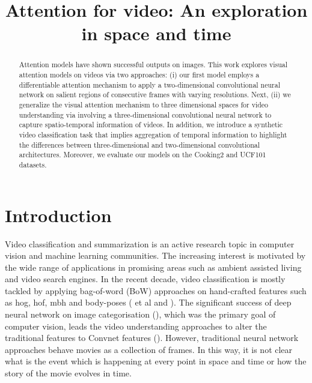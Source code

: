 \documentclass{article} %
\title{Attention for video: An exploration in space and time}
\begin{document}
\maketitle

\begin{abstract}
Attention models have shown successful outputs on images. This work explores visual attention models on videos via two approaches: (i) our first model employs a differentiable attention mechanism to apply a two-dimensional convolutional neural network on salient regions of consecutive frames with varying resolutions.
Next, (ii) we generalize the visual attention mechanism to three dimensional spaces for video understanding via involving a three-dimensional convolutional neural network to capture spatio-temporal information of videos.
In addition, we introduce a synthetic video classification task that implies aggregation of temporal information to highlight the differences between three-dimensional and two-dimensional convolutional architectures. Moreover, we evaluate our models on the Cooking2 and UCF101 datasets.
\end{abstract}

\section{Introduction}
Video classification and summarization is an active research topic in computer vision and machine learning communities. The increasing interest is motivated by the wide range of applications in promising areas such as ambient assisted living and video search engines.
In the recent decade, video classification is mostly tackled by applying bag-of-word (BoW) approaches on hand-crafted features such as hog, hof, mbh and body-poses (\cite{wang2013action} et al and \cite{uijlings2014realtime}). The significant success of deep neural network on image categorisation (\cite{szegedy2014going, simonyan2014very}), which was the primary goal of computer vision, leads the video understanding approaches to alter the traditional features to Convnet features (\cite{wang2015action, zha2015exploiting, xu2014discriminative}). However, traditional neural network approaches behave movies as a collection of frames. In this way, it is not clear what is the event which is happening at every point in space and time or how the story of the movie evolves in time.
\end{document}
